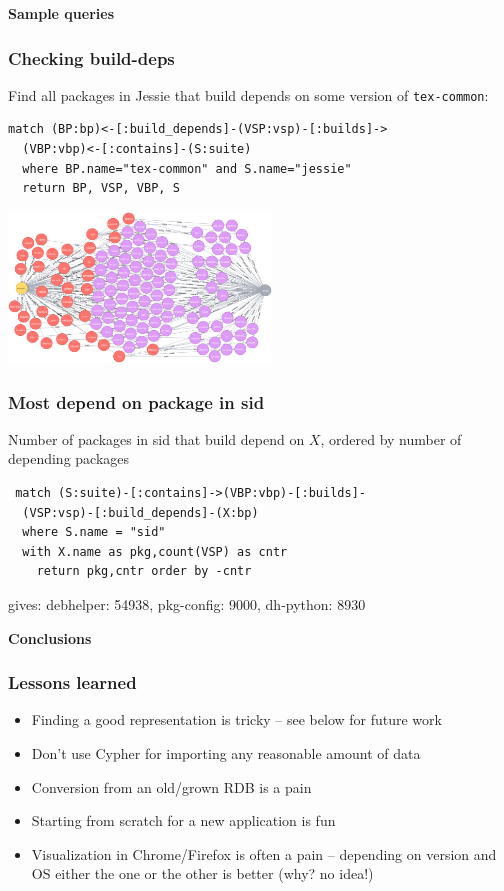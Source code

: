\documentclass[hyperref]{beamer}
\newcommand{\cutin}[1]{%
\begin{frame}[c]\begin{center}{\Large\bf\color{myblue}#1}\end{center}\end{frame}}
\def\bis{\\[\bigskipamount]}
\begin{document}
\cutin{Sample queries}

\begin{frame}[fragile]
  \frametitle{Checking build-deps}

  Find all packages in Jessie that build depends on some version of
  \texttt{tex-common}:

\begin{lstlisting}
match (BP:bp)<-[:build_depends]-(VSP:vsp)-[:builds]->
  (VBP:vbp)<-[:contains]-(S:suite)
  where BP.name="tex-common" and S.name="jessie"
  return BP, VSP, VBP, S
\end{lstlisting}
\pause
\begin{center}
  \includegraphics[height=4cm]{bd-on-tex-common.png}
\end{center}
\end{frame}

\begin{frame}[fragile]
  \frametitle{Most depend on package in sid}
  Number of packages in sid that build depend on $X$, ordered by
  number of depending packages
  \begin{lstlisting}
 match (S:suite)-[:contains]->(VBP:vbp)-[:builds]-
  (VSP:vsp)-[:build_depends]-(X:bp) 
  where S.name = "sid" 
  with X.name as pkg,count(VSP) as cntr 
    return pkg,cntr order by -cntr
\end{lstlisting}
\pause
gives: debhelper: 54938, pkg-config: 9000, dh-python: 8930
\end{frame}

\cutin{Conclusions}

\begin{frame}
  \frametitle{Lessons learned}
  \begin{itemize}
  \item Finding a good representation is tricky -- see below for
    future work\bis
  \item Don't use Cypher for importing any reasonable amount of
    data\bis
  \item Conversion from an old/grown RDB is a pain\bis
  \item Starting from scratch for a new application is fun\bis
  \item Visualization in Chrome/Firefox is often a pain -- depending
    on version and OS either the one or the other is better (why? no
    idea!) 
  \end{itemize}
\end{frame}
\end{document}
